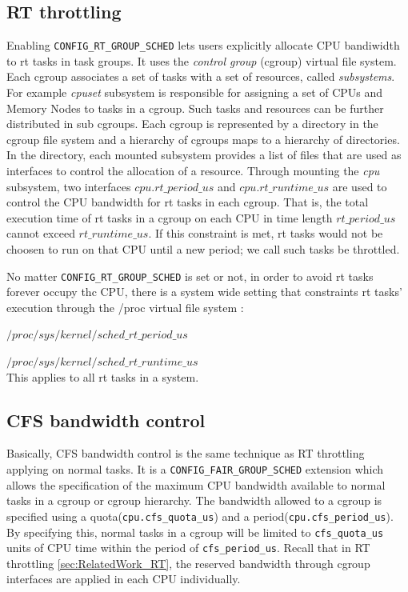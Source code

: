 \subsection{RT throttling\label{sec:RelatedWork_RT}}
Enabling \texttt{CONFIG\_RT\_GROUP\_SCHED} lets users explicitly allocate
CPU bandiwidth to rt tasks in task groups. It uses the \emph{control group}
(cgroup) virtual file system. Each cgroup associates a set of tasks with
a set of resources, called \emph{subsystems}. For example \emph{cpuset} 
subsystem is responsible for assigning a set of CPUs and Memory Nodes to
tasks in a cgroup. Such tasks and resources can be further distributed in 
sub cgroups. Each cgroup is represented by a directory in the cgroup file 
system and a hierarchy of cgroups maps to a hierarchy of directories. In 
the directory, each mounted subsystem provides a list of files that are used 
as interfaces to control the allocation of a resource.
Through mounting the \emph{cpu} subsystem, two interfaces $cpu.rt\_period\_us$ 
and $cpu.rt\_runtime\_us$ are used to control the CPU bandwidth for rt 
tasks in each cgroup. That is, the total execution time of rt tasks in a cgroup 
on each CPU in time length $rt\_period\_us$ cannot exceed $rt\_runtime\_us$. 
If this constraint is met, rt tasks would not be choosen to run on that CPU 
until a new period; we call such tasks be throttled.

No matter \texttt{CONFIG\_RT\_GROUP\_SCHED} is set or not, in order to avoid rt 
tasks forever occupy thc CPU, there is a system wide setting that constraints
rt tasks' execution through the /proc virtual file system :

	$/proc/sys/kernel/sched\_rt\_period\_us$ 

	$/proc/sys/kernel/sched\_rt\_runtime\_us$ 
\\This applies to all rt tasks in a system.

\subsection{CFS bandwidth control\label{RelatedWork_CFS}}
Basically, CFS bandwidth control is the same technique as RT throttling
applying on normal tasks. It is a \texttt{CONFIG\_FAIR\_GROUP\_SCHED} 
extension which allows the specification of the maximum CPU bandwidth
available to normal tasks  in a cgroup or cgroup hierarchy.
The bandwidth allowed to a cgroup is specified using a 
quota(\texttt{cpu.cfs\_quota\_us}) and a period(\texttt{cpu.cfs\_period\_us}).
By specifying this, normal tasks in a cgroup will be limited to 
\texttt{cfs\_quota\_us} units of CPU time within the period of 
\texttt{cfs\_period\_us}. Recall that in RT throttling \ref{sec:RelatedWork_RT},
the reserved bandwidth through cgroup interfaces are applied in each CPU
individually.
